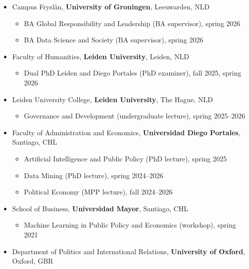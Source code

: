 \begin{publications}

\begin{itemize}
\item{\small Campus Fryslân, {\bfseries University of Groningen}, Leeuwarden, NLD}
\begin{itemize}
\item[$\circ$]{\small BA Global Responsibility and Leadership (BA supervisor), spring 2026}
\item[$\circ$]{\small BA Data Science and Society (BA supervisor), spring 2026}
\end{itemize}
\item{\small Faculty of Humanities, {\bfseries Leiden University}, Leiden, NLD}
\begin{itemize}
\item[$\circ$]{\small Dual PhD Leiden and Diego Portales (PhD examiner), fall 2025, spring 2026}
\end{itemize}
\item{\small Leiden University College, {\bfseries Leiden University}, The Hague, NLD}
\begin{itemize}
\item[$\circ$]{\small Governance and Development (undergraduate lecture), spring 2025--2026}
\end{itemize}
\item{\small Faculty of Administration and Economics, {\bfseries Universidad Diego Portales}, Santiago, CHL}
\begin{itemize}
\item[$\circ$]{\small Artificial Intelligence and Public Policy (PhD lecture), spring 2025}
\item[$\circ$]{\small Data Mining (PhD lecture), spring 2024--2026}
\item[$\circ$]{\small Political Economy (MPP lecture), fall 2024--2026}
\end{itemize}
\item{\small School of Business, {\bfseries Universidad Mayor}, Santiago, CHL}
\begin{itemize}
\item[$\circ$]{\small Machine Learning in Public Policy and Economics (workshop), spring 2021}
\end{itemize}
\item{\small Department of Politics and International Relations, {\bfseries University of Oxford}, Oxford, GBR}

\end{itemize}
\end{publications}
